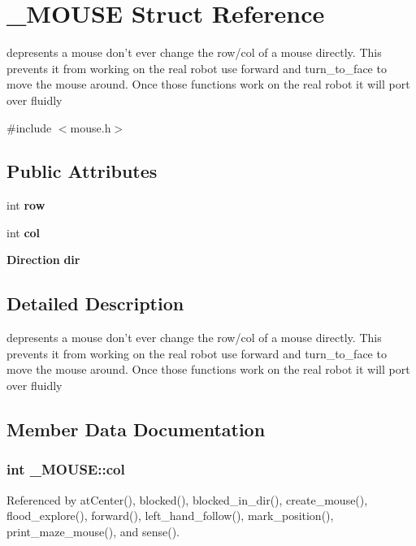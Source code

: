 \section{\-\_\-\-M\-O\-U\-S\-E Struct Reference}
\label{struct__MOUSE}


depresents a mouse don't ever change the row/col of a mouse directly. This prevents it from working on the real robot use forward and turn\-\_\-to\-\_\-face to move the mouse around. Once those functions work on the real robot it will port over fluidly  




{\ttfamily \#include $<$mouse.\-h$>$}

\subsection*{Public Attributes}
\begin{DoxyCompactItemize}
\item 
int {\bf row}
\item 
int {\bf col}
\item 
{\bf Direction} {\bf dir}
\end{DoxyCompactItemize}


\subsection{Detailed Description}
depresents a mouse don't ever change the row/col of a mouse directly. This prevents it from working on the real robot use forward and turn\-\_\-to\-\_\-face to move the mouse around. Once those functions work on the real robot it will port over fluidly 

\subsection{Member Data Documentation}
\subsubsection[{col}]{\setlength{\rightskip}{0pt plus 5cm}int \-\_\-\-M\-O\-U\-S\-E\-::col}\label{struct__MOUSE_af473aaf6728c4d711e558d81af672725}


Referenced by at\-Center(), blocked(), blocked\-\_\-in\-\_\-dir(), create\-\_\-mouse(), flood\-\_\-explore(), forward(), left\-\_\-hand\-\_\-follow(), mark\-\_\-position(), print\-\_\-maze\-\_\-mouse(), and sense().

